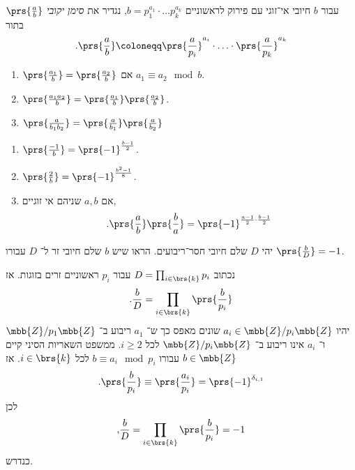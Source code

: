 \documentclass[a4paper,10pt,twoside,openany]{book}
\begin{document}
\begin{definition}
עבור
$b$
חיובי אי־זוגי עם פירוק לראשוניים
$b = p_1^{a_1} \cdot \ldots p_k^{a_k}$,
נגדיר את
\emph{סימן יקובי}
$\prs{\frac{a}{b}}$
בתור
\begin{align*}
\text{.} \prs{\frac{a}{b}} \coloneqq \prs{\frac{a}{p_i}}^{a_i} \cdot \ldots \cdot \prs{\frac{a}{p_k}}^{a_k}
\end{align*}
\end{definition}

\begin{proposition}
\begin{enumerate}
\item $\prs{\frac{a_1}{b}} = \prs{\frac{a_2}{b}}$
אם
$a_1 \equiv a_2 \mod{b}$.
\item $\prs{\frac{a_1 a_2}{b}} = \prs{\frac{a_1}{b}} \prs{\frac{a_2}{b}}$.
\item $\prs{\frac{a}{b_1 b_2}} = \prs{\frac{a}{b_1}} \prs{\frac{a}{b_2}}$
\end{enumerate}
\end{proposition}

\begin{proposition}
\begin{enumerate}
\item $\prs{\frac{-1}{b}} = \prs{-1}^{\frac{b-1}{2}}$.
\item $\prs{\frac{2}{b}} = \prs{-1}^{\frac{b^2 - 1}{8}}$.
\item אם
$a,b$
שניהם אי זוגיים,
\begin{align*}
\text{.} \prs{\frac{a}{b}} \prs{\frac{b}{a}} = \prs{-1}^{\frac{a - 1}{2} \cdot \frac{b-1}{2}}
\end{align*}
\end{enumerate}
\end{proposition}

\begin{exercisechap}
יהי
$D$
שלם חיובי חסר־ריבועים. הראו שיש
$b$
שלם חיובי זר ל־%
$D$
עבורו
$\prs{\frac{b}{D}} = -1$.
\end{exercisechap}

\begin{solution}
נכתוב
$D = \prod_{i \in \brs{k}} p_i$
עבור
$p_i$
ראשוניים זרים בזוגות.
אז
\begin{align*}
\text{.} \frac{b}{D} = \prod_{i \in \brs{k}} \prs{\frac{b}{p_i}}
\end{align*}
יהיו
$a_i \in \mbb{Z} / p_i \mbb{Z}$
שונים מאפס כך ש־%
$a_1$
ריבוע ב־%
$\mbb{Z} / p_1 \mbb{Z}$
ו־%
$a_i$
אינו ריבוע ב־%
$\mbb{Z} / p_i \mbb{Z}$
לכל
$i \geq 2$.
ממשפט השאריות הסיני קיים
$b \in \mbb{Z}$
עבורו
$b \equiv a_i \mod{p_i}$
לכל
$i \in \brs{k}$.
אז
\[\text{.} \prs{\frac{b}{p_i}} \equiv \prs{\frac{a_i}{p_i}} = \prs{-1}^{\delta_{i,1}}\]
לכן
\begin{align*}
\text{,} \frac{b}{D} = \prod_{i \in \brs{k}} \prs{\frac{b}{p_i}} = -1
\end{align*}
כנדרש.
\end{solution}
\end{document}
